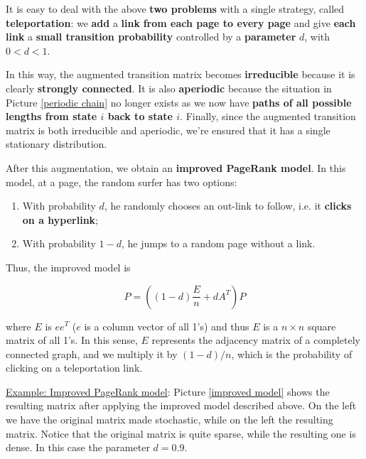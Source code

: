 It is easy to deal with the above \textbf{two problems} with a single strategy, called \textbf{teleportation}: we \textbf{add} a \textbf{link} \textbf{from each page to every page} and give \textbf{each link} a \textbf{small transition probability} controlled by a \textbf{parameter} $d$, with $0 < d < 1$.

In this way, the augmented transition matrix becomes \textbf{irreducible} because it is clearly \textbf{strongly connected}. It is also \textbf{aperiodic} because the situation in Picture \ref{periodic chain} no longer exists as we now have \textbf{paths of all possible lengths from state $i$ back to state $i$}. Finally, since the augmented transition matrix is both irreducible and aperiodic, we're ensured that it has a single stationary distribution.

After this augmentation, we obtain an \textbf{improved PageRank model}. In this model, at a page, the random surfer has two options: 

\begin{enumerate}
    \item With probability $d$, he randomly chooses an out-link to follow, i.e. it \textbf{clicks on a hyperlink};
    \item With probability $1-d$, he jumps to a random page without a link.
\end{enumerate}

Thus, the improved model is

\begin{equation}
    P = ((1-d) \frac{E}{n} + dA^T) P
\end{equation}

where $E$ is $ee^T$ ($e$ is a column vector of all 1’s) and thus $E$ is a $n \times n$ square matrix of all 1’s. In this sense, $E$ represents the adjacency matrix of a completely connected graph, and we multiply it by $(1-d)/n$, which is the probability of clicking on a teleportation link.

\underline{Example: Improved PageRank model}: Picture \ref{improved model} shows the resulting matrix after applying the improved model described above. On the left we have the original matrix made stochastic, while on the left the resulting matrix. Notice that the original matrix is quite sparse, while the resulting one is dense. In this case the parameter $d = 0.9$.

